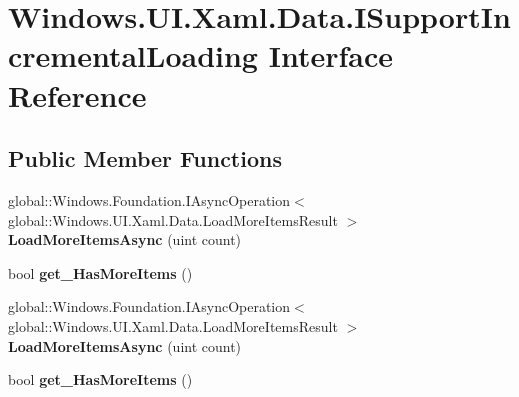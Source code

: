 \hypertarget{interface_windows_1_1_u_i_1_1_xaml_1_1_data_1_1_i_support_incremental_loading}{}\section{Windows.\+U\+I.\+Xaml.\+Data.\+I\+Support\+Incremental\+Loading Interface Reference}
\label{interface_windows_1_1_u_i_1_1_xaml_1_1_data_1_1_i_support_incremental_loading}
\subsection*{Public Member Functions}
\begin{DoxyCompactItemize}
\item 
\mbox{\label{interface_windows_1_1_u_i_1_1_xaml_1_1_data_1_1_i_support_incremental_loading_a088da056046c52ceef07d8ae51bbf566}} 
global\+::\+Windows.\+Foundation.\+I\+Async\+Operation$<$ global\+::\+Windows.\+U\+I.\+Xaml.\+Data.\+Load\+More\+Items\+Result $>$ {\bfseries Load\+More\+Items\+Async} (uint count)
\item 
\mbox{\label{interface_windows_1_1_u_i_1_1_xaml_1_1_data_1_1_i_support_incremental_loading_a945d3d55106fecefe395d317500cef48}} 
bool {\bfseries get\+\_\+\+Has\+More\+Items} ()
\item 
\mbox{\label{interface_windows_1_1_u_i_1_1_xaml_1_1_data_1_1_i_support_incremental_loading_a088da056046c52ceef07d8ae51bbf566}} 
global\+::\+Windows.\+Foundation.\+I\+Async\+Operation$<$ global\+::\+Windows.\+U\+I.\+Xaml.\+Data.\+Load\+More\+Items\+Result $>$ {\bfseries Load\+More\+Items\+Async} (uint count)
\item 
\mbox{\label{interface_windows_1_1_u_i_1_1_xaml_1_1_data_1_1_i_support_incremental_loading_a945d3d55106fecefe395d317500cef48}} 
bool {\bfseries get\+\_\+\+Has\+More\+Items} ()
\item 
\mbox{\label{interface_windows_1_1_u_i_1_1_xaml_1_1_data_1_1_i_support_incremental_loading_a088da056046c52ceef07d8ae51bbf566}} 

\end{DoxyCompactItemize}
